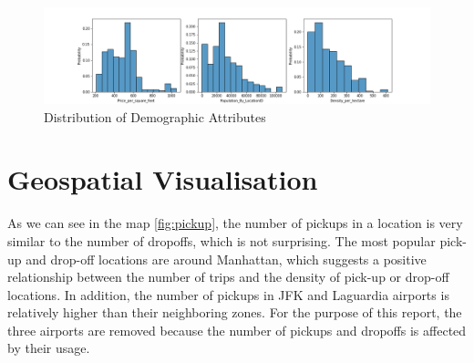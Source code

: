 \documentclass[11pt]{article}
\begin{document}
\begin{figure}[h]
    \includegraphics[width=1.15\textwidth]{plots/distribution_of_demo.png}
    \caption{Distribution of Demographic Attributes}
    \label{fig:distributionofdemo}
\end{figure}
\section{Geospatial Visualisation}
As we can see in the map \ref{fig:pickup}, the number of pickups in a location is very similar to the number of dropoffs, which is not surprising. The most popular pick-up and drop-off locations are around Manhattan, which suggests a positive relationship between the number of trips and the density of pick-up or drop-off locations. In addition, the number of pickups in JFK and Laguardia airports is relatively higher than their neighboring zones. For the purpose of this report, the three airports are removed because the number of pickups and dropoffs is affected by their usage. 
\end{document}
